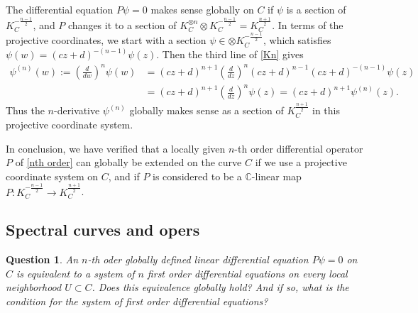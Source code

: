 \documentclass{amsart}
\newtheorem{quest}[thm]{Question}
\theoremstyle{definition}
\numberwithin{equation}{section}
\numberwithin{figure}{section}
\def\tensor{\otimes}
\newcommand{\bC}{{\mathbb{C}}}
\newcommand{\lrar}{\longrightarrow}
\begin{document}
The differential equation $P\psi = 0$ makes sense globally on $C$ 
if $\psi$ is a section of $K_C^{-\frac{n-1}{2}}$, and $P$ changes it
to a section of $K_C^{\tensor n}\tensor K_C^{-\frac{n-1}{2}}
= K_C^{\frac{n+1}{2}}$. In terms of the projective coordinates, 
we start with a section $\psi\in \tensor K_C^{-\frac{n-1}{2}}$, which satisfies
$\psi(w) = (cz+d)^{-(n-1)}\psi(z)$. Then the third line of \eqref{Kn} gives
\begin{align*}
\psi^{(n)}(w):= \left(\frac{d}{dw}\right)^n \psi(w)
&=
(cz+d)^{n+1}\left(\frac{d}{dz}\right)^n(cz+d)^{n-1}
(cz+d)^{-(n-1)}\psi(z)
\\
&=(cz+d)^{n+1}\left(\frac{d}{dz}\right)^n\psi(z) = (cz+d)^{n+1}\psi^{(n)}
(z).
\end{align*}
Thus the $n$-derivative $\psi^{(n)}$ globally makes sense
as a section of  $K_C^{\frac{n+1}{2}}$ in this
projective coordinate system.

In conclusion, we have verified that a locally given 
$n$-th order differential operator $P$ of \eqref{nth order}
can globally be extended on the curve $C$
if we use a projective coordinate system on 
$C$,  and if $P$ is considered to be a $\bC$-linear map
$P:K_C^{-\frac{n-1}{2}}\lrar K_C^{\frac{n+1}{2}}$.










\subsection{Spectral curves and opers}
\label{subsect:oper}

\begin{quest}
An $n$-th oder globally defined  linear differential equation $P\psi=0$ on $C$ is
equivalent to a system of $n$ first order differential
equations on every local neighborhood $U\subset C$.
Does this equivalence globally hold? And if so, what is the 
condition for the system of first order differential equations?
\end{quest}
\end{document}
